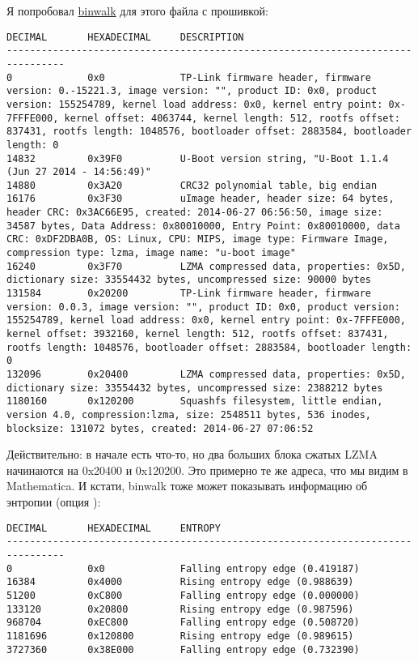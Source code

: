 Я попробовал \href{http://binwalk.org/}{binwalk} для этого файла с прошивкой:

\begin{lstlisting}
DECIMAL       HEXADECIMAL     DESCRIPTION
--------------------------------------------------------------------------------
0             0x0             TP-Link firmware header, firmware version: 0.-15221.3, image version: "", product ID: 0x0, product version: 155254789, kernel load address: 0x0, kernel entry point: 0x-7FFFE000, kernel offset: 4063744, kernel length: 512, rootfs offset: 837431, rootfs length: 1048576, bootloader offset: 2883584, bootloader length: 0
14832         0x39F0          U-Boot version string, "U-Boot 1.1.4 (Jun 27 2014 - 14:56:49)"
14880         0x3A20          CRC32 polynomial table, big endian
16176         0x3F30          uImage header, header size: 64 bytes, header CRC: 0x3AC66E95, created: 2014-06-27 06:56:50, image size: 34587 bytes, Data Address: 0x80010000, Entry Point: 0x80010000, data CRC: 0xDF2DBA0B, OS: Linux, CPU: MIPS, image type: Firmware Image, compression type: lzma, image name: "u-boot image"
16240         0x3F70          LZMA compressed data, properties: 0x5D, dictionary size: 33554432 bytes, uncompressed size: 90000 bytes
131584        0x20200         TP-Link firmware header, firmware version: 0.0.3, image version: "", product ID: 0x0, product version: 155254789, kernel load address: 0x0, kernel entry point: 0x-7FFFE000, kernel offset: 3932160, kernel length: 512, rootfs offset: 837431, rootfs length: 1048576, bootloader offset: 2883584, bootloader length: 0
132096        0x20400         LZMA compressed data, properties: 0x5D, dictionary size: 33554432 bytes, uncompressed size: 2388212 bytes
1180160       0x120200        Squashfs filesystem, little endian, version 4.0, compression:lzma, size: 2548511 bytes, 536 inodes, blocksize: 131072 bytes, created: 2014-06-27 07:06:52
\end{lstlisting}

Действительно: в начале есть что-то, но два больших блока сжатых LZMA начинаются на 0x20400 и 0x120200.
Это примерно те же адреса, что мы видим в Mathematica.
И кстати, binwalk тоже может показывать информацию об энтропии (опция ):

\begin{lstlisting}
DECIMAL       HEXADECIMAL     ENTROPY
--------------------------------------------------------------------------------
0             0x0             Falling entropy edge (0.419187)
16384         0x4000          Rising entropy edge (0.988639)
51200         0xC800          Falling entropy edge (0.000000)
133120        0x20800         Rising entropy edge (0.987596)
968704        0xEC800         Falling entropy edge (0.508720)
1181696       0x120800        Rising entropy edge (0.989615)
3727360       0x38E000        Falling entropy edge (0.732390)
\end{lstlisting}

